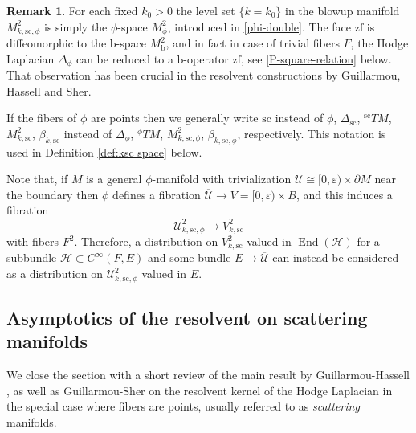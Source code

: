 \documentclass[JEP,XML,SOM,Unicode,NoFloatCountersInSection,published]{cedram}
\theoremstyle{plain}
\theoremstyle{definition}
\newtheorem{Rem}[Th]{Remark}
\newcommand{\Umath}{{\mathscr{U}}}
\newcommand{\Umathbar}{{\overline{\mathscr{U}}}}
\newcommand{\Hmath}{{\mathscr{H}}}
\newcommand{\ssc}{{\mathrm{sc}}}
\newcommand{\zf}{{\mathrm{zf}}}
\DeclareMathOperator{\End}{End}
\newcommand{\Cinf}{C^\infty}
\newcommand{\dM}{{\partial M}}
\newcommand{\phiT}{{}^\phi T}
\newcommand{\scT}{{}^{\mathrm{sc}}T}
\let\eps\varepsilon
\begin{document}
\begin{Rem}
For each fixed $k_0> 0$ the level set $\{k=k_0\}$ in the blowup
manifold $M^{2}_{k, \ssc,\phi}$ is simply the $\phi$-space
$M_\phi^2$, introduced in \eqref{phi-double}. The face $\zf$ is diffeomorphic to
the b-space $M^{2}_\text{b}$, and in fact in case of trivial
fibers $F$, the Hodge Laplacian $\Delta_{\phi}$ can be reduced to a
b-operator $\zf$, see \eqref{P-square-relation} below. That observation has been crucial in
the resolvent constructions by Guillarmou, Hassell and Sher.
\end{Rem}

If the fibers of $\phi$ are points then we generally write $\ssc$ instead of $\phi$, \eg $\Delta_{\ssc}$, $\scT M$, $M^2_{k,\ssc}$,
$\beta_{k, \ssc}$ instead of $\Delta_\phi$, $\phiT M$, $M^2_{k,\ssc,\phi}$, $\beta_{k, \ssc,\phi}$, respectively. This
notation is used \eg in Definition \ref{def:ksc space} below.

Note that, if $M$ is a general $\phi$-manifold with trivialization $\Umathbar\cong[0,\eps)\times\dM$
near the boundary then $\phi$ defines a fibration $\Umathbar\to V=[0,\eps)\times B$, and this induces a fibration
\begin{equation}
\label{eqn:F2 fibration}
\Umath^2_{k,\ssc,\phi} \to V^2_{k,\ssc}
\end{equation}
with fibers $F^2$. Therefore, a distribution on $V^2_{k,\ssc}$ valued in $\End(\Hmath)$ for a
subbundle $\Hmath\subset \Cinf(F,E)$ and some bundle $E\to\Umathbar$ can instead be considered as a distribution on $\Umath^2_{k,\ssc,\phi}$ valued in $E$.

\subsection{Asymptotics of the resolvent on scattering manifolds} \label{section 4.4}
We close the section with a short review of the main
result by Guillarmou-Hassell \cite{guillarmou2008resolvent}, as well as
Guillarmou-Sher \cite{guillarmou2014low} on the resolvent
kernel of the Hodge Laplacian in the special case where fibers are points, usually referred to as
\emph{scattering} manifolds.
\end{document}
